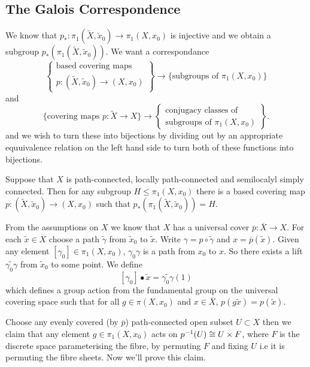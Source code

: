 \documentclass{article}
\begin{document}
\subsection{The Galois Correspondence}
We know that $ p_*: \pi_1(\tilde X, \tilde x_0) \to \pi_1(X,x_0) $ is injective and we obtain a subgroup $ p_*(\pi_1(\tilde X,\tilde x_0)) $. We want a correspondance
\[
\left\{ \begin{array}{c}
\text{based covering maps} \\
p : (\widetilde{X}, \tilde{x}_0) \to (X, x_0)
\end{array} \right\}
\longrightarrow
\{\text{subgroups of } \pi_1(X, x_0)\}
\]
and
\[
\{\text{covering maps } p : \widetilde{X} \to X\}
\longrightarrow
\left\{ \begin{array}{c}
\text{conjugacy classes of} \\
\text{subgroups of } \pi_1(X, x_0)
\end{array} \right\}.
\]
and we wish to turn these into bijections by dividing out by an appropriate equuivalence relation on the left hand side to turn both of these functions into bijections.
\begin{proposition}
  Suppose that $ X $ is path-connected, locally path-connected and semilocalyl simply connected. Then for any subgroup $ H \le \pi_1(X,x_0) $ there is a based covering map $ p:(\tilde X,\tilde x_0) \to (X,x_0) $ such that $ p_*(\pi_1(\tilde X,\tilde x_0))=H $.
\end{proposition}
\pf From the assumptions on $ X $ we know that $ X $ has a universal cover $ \overline p:\overline X \to X $. For each $ \tilde x\in \overline X $ choose a path $ \tilde \gamma $ from	$ \tilde x_0 $ to $ \tilde x $. Write $ \gamma = p\circ\tilde \gamma $ and $ x = \overline p(\tilde x) $. Given any element $ [\gamma_0] \in \pi_1(X,x_0) $, $ \gamma_0\gamma $ is a path from $ x_0 $ to $ x $. So there exists a lift $ \widetilde{\gamma_0\gamma} $ from $ \tilde x_0 $ to some point. We define
\[
	[\gamma_0]\bullet \tilde x = \widetilde{\gamma_0\gamma}(1)
\]
which defines a group action from the fundamental group on the universal covering space such that for all $ g\in \pi(X,x_0) $ and $ x\in \overline X $, $ p(g\tilde x) = p(\tilde x) $.\par
Choose any evenly covered (by $ \overline p $) path-connected open subset $ U\subset X $ then we claim that any element $ g\in \pi_1(X,x_0) $ acts on $ {p}^{-1}(U) \cong U \times F $, where $ F $ is the discrete space parameterising the fibre, by permuting $ F $ and fixing $ U $ i.e it is permuting the fibre sheets. Now we'll prove this claim.\par
\end{document}
